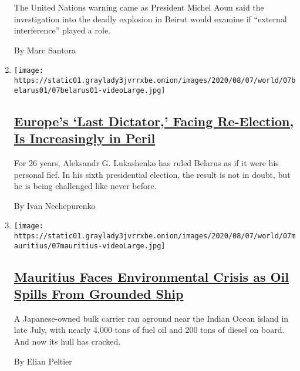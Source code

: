 \begin{enumerate}
  The United Nations warning came as President Michel Aoun said the
  investigation into the deadly explosion in Beirut would examine if
  ``external interference'' played a role.

  By Marc Santora
\item
  \texttt{[image: https://static01.graylady3jvrrxbe.onion/images/2020/08/07/world/07belarus01/07belarus01-videoLarge.jpg]}

  \hypertarget{europes-last-dictator-facing-re-election-is-increasingly-in-peril}{%
  \subsection{\texorpdfstring{\href{/2020/08/07/world/europe/belarus-election-aleksandr-lukashenko.html}{Europe's
  `Last Dictator,' Facing Re-Election, Is Increasingly in
  Peril}}{Europe's `Last Dictator,' Facing Re-Election, Is Increasingly in Peril}}\label{europes-last-dictator-facing-re-election-is-increasingly-in-peril}}

  For 26 years, Aleksandr G. Lukashenko has ruled Belarus as if it were
  his personal fief. In his sixth presidential election, the result is
  not in doubt, but he is being challenged like never before.

  By Ivan Nechepurenko
\item
  \texttt{[image: https://static01.graylady3jvrrxbe.onion/images/2020/08/07/world/07mauritius/07mauritius-videoLarge.jpg]}

  \hypertarget{mauritius-faces-environmental-crisis-as-oil-spills-from-grounded-ship}{%
  \subsection{\texorpdfstring{\href{/2020/08/07/world/africa/mauritius-oil-spill.html}{Mauritius
  Faces Environmental Crisis as Oil Spills From Grounded
  Ship}}{Mauritius Faces Environmental Crisis as Oil Spills From Grounded Ship}}\label{mauritius-faces-environmental-crisis-as-oil-spills-from-grounded-ship}}

  A Japanese-owned bulk carrier ran aground near the Indian Ocean island
  in late July, with nearly 4,000 tons of fuel oil and 200 tons of
  diesel on board. And now its hull has cracked.

  By Elian Peltier
\end{enumerate}

